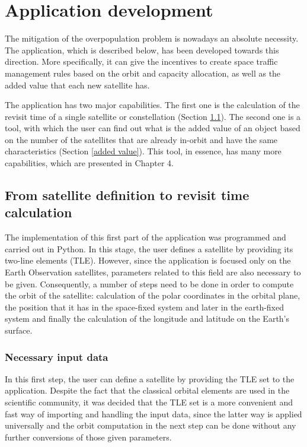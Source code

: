 \chapter{Application development}
\label{chap:3}
\bigskip

The mitigation of the overpopulation problem is nowadays an absolute necessity. The application, which is described below, has been developed towards this direction. More specifically, it can give the incentives to create space traffic management rules based on the orbit and capacity allocation, as well as the added value that each new satellite has.

The application has two major capabilities. The first one is the calculation of the revisit time of a single satellite or constellation (Section \ref{revisit time}). The second one is a tool, with which the user can find out what is the added value of an object based on the number of the satellites that are already in-orbit and have the same characteristics (Section \ref{added value}). This tool, in essence, has many more capabilities, which are presented in Chapter 4.%

\bigskip
\section{From satellite definition to revisit time calculation}
\label{revisit time}
\bigskip

The implementation of this first part of the application was programmed and carried out in Python. In this stage, the user defines a satellite by providing its two-line elements (TLE). However, since the application is focused only on the Earth Observation satellites, parameters related to this field are also necessary to be given. Consequently, a number of steps need to be done in order to compute the orbit of the satellite: calculation of the polar coordinates in the orbital plane, the position that it has in the space-fixed system and later in the earth-fixed system and finally the calculation of the longitude and latitude on the Earth's surface.

\bigskip
\subsection{Necessary input data}
\label{input_data}
\bigskip

In this first step, the user can define a satellite by providing the TLE set to the application. Despite the fact that the classical orbital elements are used in the scientific community, it was decided that the TLE set is a more convenient and fast way of importing and handling the input data, since the latter way is applied universally and the orbit computation in the next step can be done without any further conversions of those given parameters.

